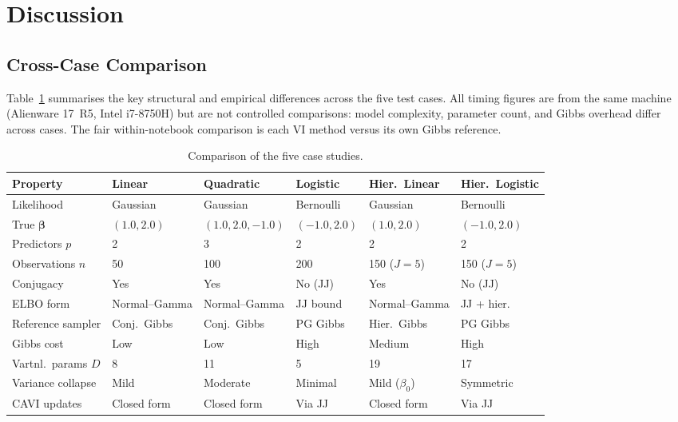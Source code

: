\documentclass[11pt,a4paper]{article}
\begin{document}
\section{Discussion}
\label{sec:discussion}

\subsection{Cross-Case Comparison}

Table~\ref{tab:comparison} summarises the key structural and empirical differences
across the five test cases.
All timing figures are from the same machine (Alienware 17~R5, Intel i7-8750H) but
are not controlled comparisons: model complexity, parameter count, and Gibbs overhead
differ across cases.
The fair within-notebook comparison is each VI method versus its own Gibbs reference.

\begin{table}[H]
\centering
\caption{Comparison of the five case studies.}
\label{tab:comparison}
\begin{tabular}{@{}llllll@{}}
\toprule
Property & Linear & Quadratic & Logistic & Hier.~Linear & Hier.~Logistic \\
\midrule
Likelihood & Gaussian & Gaussian & Bernoulli & Gaussian & Bernoulli \\
True $\bm{\beta}$ & $(1.0, 2.0)$ & $(1.0, 2.0, -1.0)$ & $(-1.0, 2.0)$ & $(1.0, 2.0)$ & $(-1.0, 2.0)$ \\
Predictors $p$ & 2 & 3 & 2 & 2 & 2 \\
Observations $n$ & 50 & 100 & 200 & 150 ($J\!=\!5$) & 150 ($J\!=\!5$) \\
Conjugacy & Yes & Yes & No (JJ) & Yes & No (JJ) \\
ELBO form & Normal--Gamma & Normal--Gamma & JJ bound & Normal--Gamma & JJ + hier.\ \\
Reference sampler & Conj.~Gibbs & Conj.~Gibbs & PG Gibbs & Hier.~Gibbs & PG Gibbs \\
Gibbs cost & Low & Low & High & Medium & High \\
Vartnl.~params $D$ & 8 & 11 & 5 & 19 & 17 \\
Variance collapse & Mild & Moderate & Minimal & Mild ($\beta_0$) & Symmetric \\
CAVI updates & Closed form & Closed form & Via JJ & Closed form & Via JJ \\
\bottomrule
\end{tabular}
\end{table}
\end{document}
